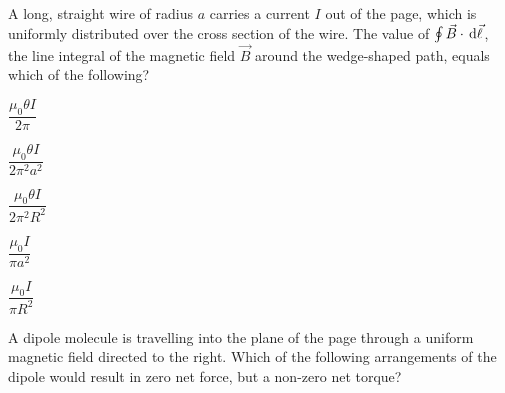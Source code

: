 \documentclass[12pt]{../../oss-apphys-exam}
\begin{document}
\begin{questions}
  
  \question A long, straight wire of radius $a$ carries a current $I$ out of
  the page, which is uniformly distributed over the cross section of the wire.
  The value of $\oint \vec B\cdot\dl{\vec\ell}$, the line integral of the
  magnetic field $\vec B$ around the wedge-shaped path, equals which of the
  following?
  \begin{choices}
  \item $\dfrac{\mu_0\theta I}{2\pi}$
  \item $\dfrac{\mu_0\theta I}{2\pi^2a^2}$
  \item $\dfrac{\mu_0\theta I}{2\pi^2R^2}$
  \item $\dfrac{\mu_0I}{\pi a^2}$
  \item $\dfrac{\mu_0I}{\pi R^2}$
  \end{choices}
  \newpage

  
  \question A dipole molecule is travelling into the plane of the page through a
  uniform magnetic field directed to the right. Which of the following
  arrangements of the dipole would result in zero net force, but a non-zero net
  torque?
  
  \begin{oneparchoices}
    \choice
    \hspace{.3in}


\end{oneparchoices}
\end{questions}
\end{document}
